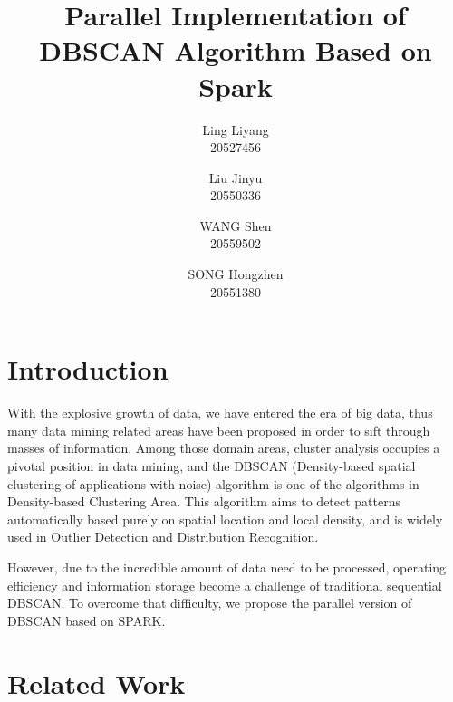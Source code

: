 \documentclass[letterpaper,twocolumn,10pt]{article}
\begin{document}
\date{}

\title{\Large \bf Parallel Implementation of DBSCAN Algorithm Based on Spark}

\author{
{\rm Ling Liyang}\\
20527456
\and
{\rm Liu Jinyu}\\
20550336
\and
{\rm WANG Shen}\\
20559502
\and
{\rm SONG Hongzhen}\\
20551380
}

\maketitle

\thispagestyle{empty}


\section{Introduction}
\quad With the explosive growth of data, we have entered the era of big data, thus many data mining related areas have been proposed in order to sift through masses of information. Among those domain areas, cluster analysis occupies a pivotal position in data mining, and the DBSCAN (Density-based spatial clustering of applications with noise) algorithm is one of the algorithms in Density-based Clustering Area. This algorithm aims to detect patterns automatically based purely on spatial location and local density, and is widely used in Outlier Detection and Distribution Recognition.

However, due to the incredible amount of data need to be processed, operating efficiency and information storage become a challenge of traditional sequential DBSCAN. To overcome that difficulty, we propose the parallel version of DBSCAN based on SPARK.

\section{Related Work}
\end{document}
